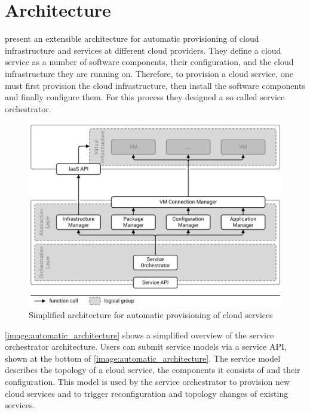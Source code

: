 \section{Architecture}
\label{related:architecture}

\citeauthor{provisioning:architecture} present an extensible architecture for automatic provisioning of cloud infrastructure and services at different cloud providers.
They define a cloud service as a number of software components, their configuration, and the cloud infrastructure they are running on.
Therefore, to provision a cloud service, one must first provision the cloud infrastructure, then install the software components and finally configure them.
For this process they designed a so called service orchestrator.

\begin{figure}[!htbp]
	\centering
	\includegraphics[resolution=600]{related/assets/automatic_architecture}
	\caption{Simplified architecture for automatic provisioning of cloud services~\autocite[based on][]{provisioning:architecture}}
	\label{image:automatic_architecture}
\end{figure}

\autoref{image:automatic_architecture} shows a simplified overview of the service orchestrator architecture.
Users can submit service models via a service API, shown at the bottom of \autoref{image:automatic_architecture}.
The service model describes the topology of a cloud service, the components it consists of and their configuration.
This model is used by the service orchestrator to provision new cloud services and to trigger reconfiguration and topology changes of existing services.

